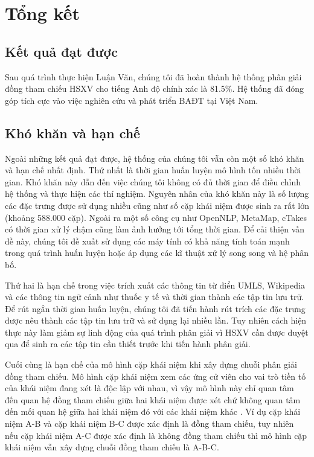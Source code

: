 \chapter{Tổng kết}

\section{Kết quả đạt được}
Sau quá trình thực hiện Luận Văn, chúng tôi đã hoàn thành hệ thống phân giải đồng tham chiếu HSXV cho tiếng Anh độ chính xác là 81.5\%. Hệ thống đã đóng góp tích cực vào việc nghiên cứu và phát triển BAĐT tại Việt Nam.

\section{Khó khăn và hạn chế}
Ngoài những kết quả đạt được, hệ thống của chúng tôi vẫn còn một số khó khăn và hạn chế nhất định. Thứ nhất là thời gian huấn luyện mô hình tốn nhiều thời gian. Khó khăn này dẫn đến việc chúng tôi không có đủ thời gian để điều chỉnh hệ thống và thực hiện các thí nghiệm. Nguyên nhân của khó khăn này là số lượng các đặc trưng được sử dụng nhiều cũng như số cặp khái niệm được sinh ra rất lớn (khoảng 588.000 cặp). Ngoài ra một số công cụ như OpenNLP, MetaMap, cTakes có thời gian xử lý chậm cũng làm ảnh hưởng tới tổng thời gian. Để cải thiện vấn đề này, chúng tôi đề xuất sử dụng các máy tính có khả năng tính toán mạnh trong quá trình huấn luyện hoặc áp dụng các kĩ thuật xử lý song song và hệ phân bố.

Thứ hai là hạn chế trong việc trích xuất các thông tin từ điển UMLS, Wikipedia và các thông tin ngữ cảnh như thuốc y tế và thời gian thành các tập tin lưu trữ. Để rút ngắn thời gian huấn luyện, chúng tôi đã tiến hành rút trích các đặc trưng được nêu thành các tập tin lưu trữ và sử dụng lại nhiều lần. Tuy nhiên cách hiện thực này làm giảm sự linh động của quá trình phân giải vì HSXV cần được duyệt qua để sinh ra các tập tin cần thiết trước khi tiến hành phân giải.

Cuối cùng là hạn chế của mô hình cặp khái niệm khi xây dựng chuỗi phân giải đồng tham chiếu. Mô hình cặp khái niệm xem các ứng cử viên cho vai trò tiền tố của khái niệm đang xét là độc lập với nhau, vì vậy mô hình này chỉ quan tâm đến quan hệ đồng tham chiếu giữa hai khái niệm được xét chứ không quan tâm đến mối quan hệ giữa hai khái niệm đó với các khái niệm khác \cite{VincentNg2010}. Ví dụ cặp khái niệm A-B và cặp khái niệm B-C được xác định là đồng tham chiếu, tuy nhiên nếu cặp khái niệm A-C được xác định là không đồng tham chiếu thì mô hình cặp khái niệm vẫn xây dựng chuỗi đồng tham chiếu là A-B-C.

